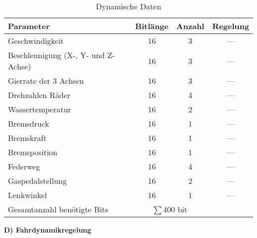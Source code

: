 \documentclass[fontsize = 12pt, paper = a4]{scrreprt}
\begin{document}
\begin{table}[h]
\caption{Dynamische Daten}

\begin{tabular}{ l | c | c | c }

\toprule[1.5pt]
\textbf{Parameter} & \textbf{Bitlänge} & \textbf{Anzahl} & \textbf{Regelung} \\ 

\midrule
Geschwindigkeit                         & 16 & 3 & --- \\
Beschleunigung (X-, Y- und Z-Achse)     & 16 & 3 & --- \\
\gls{Gierrate} der 3 Achsen                   & 16 & 3 & --- \\
Drehzahlen Räder                        & 16 & 4 & --- \\
Wassertemperatur                        & 16 & 2 & --- \\
Bremsdruck                              & 16 & 1 & --- \\
Bremskraft                              & 16 & 1 & --- \\
Bremsposition                           & 16 & 1 & --- \\
Federweg                                & 16 & 4 & --- \\
Gaspedalstellung                        & 16 & 2 & --- \\
Lenkwinkel                              & 16 & 1 & --- \\

\midrule
Gesamtanzahl benötigte Bits & \multicolumn{2}{c}{$\sum 400$ bit} \\

\bottomrule[1.5pt]

\end{tabular}

\label{Dynamische Daten}
\end{table}

\vspace{\baselineskip}


\textbf{D) Fahrdynamikregelung} 
\end{document}
